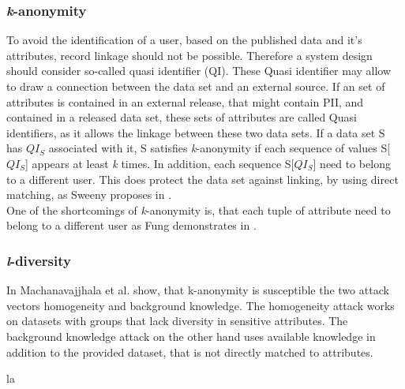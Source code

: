         \subsubsection{\textit{k}-anonymity}
            \label{subsec:related:kanon}
            To avoid the identification of a user, based on the published data and it's attributes, record linkage should not be possible. Therefore a system design should consider so-called quasi identifier (QI). These Quasi identifier may allow to draw a connection between the data set and an external source\cite{sweeney_k-anonymity_2002}.
            If an set of attributes is contained in an external release, that might contain PII, and contained in a released data set, these sets of attributes are called Quasi identifiers, as it allows the linkage between these two data sets.
            If a data set S has $QI_S$ associated with it, S satisfies \textit{k}-anonymity if each sequence of values S[$QI_S$] appears at least \textit{k} times. 
        	In addition, each sequence S[$QI_S$] need to belong to a different user.
        	This does protect the data set against linking, by using direct matching, as Sweeny proposes in \cite{sweeney_k-anonymity_2002}.\\
            
            One of the shortcomings of \textit{k}-anonymity is, that each tuple of attribute need to belong to a different user as Fung demonstrates in \cite{fung_introduction_2011}.

        \subsubsection{\textit{l}-diversity}
            \label{subsec:related:l-div}
            In \cite{machanavajjhala_l-diversity_2007} Machanavajjhala et al. show, that k-anonymity is susceptible the two attack vectors homogeneity and background knowledge.
            The homogeneity attack works on datasets with groups that lack diversity in sensitive attributes. The background knowledge attack on the other hand uses available knowledge in addition to the provided dataset, that is not directly matched to attributes.

   la     %
